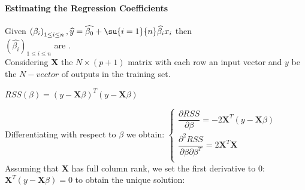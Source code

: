 \paragraph{Estimating the Regression Coefficients}
Given $\left(\beta_{i}\right)_{1\leq i\leq n},\widehat{y}=\widehat{\beta_{0}}+
\su{{i=1}}{n}\widehat{\beta_{i}}x_{i}$ then 
\\$\left(\widehat{\beta_{i}}\right)_{1\leq i\leq n}$ are .\\
Considering $\bm{X}$ the $N\times (p+1)$ matrix with each row an input
vector and $y$ be the $N-vector$ of outputs in the training set.
\begin{center}
	$RSS(\beta)=(y-\bm{X}\beta)^{T}(y-\bm{X}\beta)$
\end{center}
Differentiating with respect to $\beta$ we obtain:
$
\begin{cases}
	\dfrac{\partial RSS}{\partial\beta}=-2\bm{X}^{T}(y-\bm{X}\beta)\\
	\dfrac{\partial^{2} RSS}{\partial\beta\partial\beta^{T}}=2\bm{X}^{T}\bm{X}\\
\end{cases}
$\\
Assuming that $\bm{X}$ has full column rank, we set the first 
derivative to 0:\\ $\bm{X}^{T}(y-\bm{X}\beta)=0$ to obtain the unique
solution:

